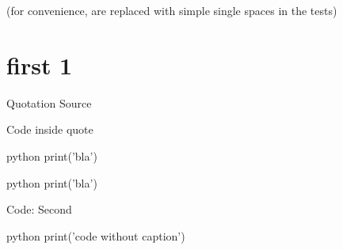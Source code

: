 (for convenience,   are replaced with simple single spaces in the tests)

\chapter{first 1}

\begin{Quotation}{Quotation Source}

Code inside quote

\begin{codeBlock}{python}
print('bla')
\end{codeBlock}
\end{Quotation}

\begin{codeBlock}[First]{python}
print('bla')
\end{codeBlock}

Code: Second

\begin{codeBlock}{python}
print('code without caption')
\end{codeBlock}
